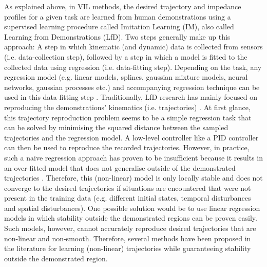 



As explained above, in VIL methods, the desired trajectory and impedance profiles for a given task are learned from human demonstrations using a supervised learning procedure called Imitation Learning (IM), also called Learning from Demonstrations (LfD). Two steps generally make up this approach: A step in which kinematic (and dynamic) data is collected from sensors (i.e. data-collection step), followed by a step in which a model is fitted to the collected data using regression (i.e. data-fitting step). Depending on the task, any regression model (e.g. linear models, splines, gaussian mixture models, neural networks, gaussian processes etc.) and accompanying regression technique can be used in this data-fitting step \cite{kroemerReviewRobotLearning2021,husseinImitationLearningSurvey2017}. Traditionally, LfD research has mainly focused on reproducing the demonstrations' kinematics (i.e. trajectories) \cite{siReviewManipulationSkill2021}. At first glance, this trajectory reproduction problem seems to be a simple regression task that can be solved by minimising the squared distance between the sampled trajectories and the regression model. A low-level controller like a PID controller can then be used to reproduce the recorded trajectories. However, in practice, such a naive regression approach has proven to be insufficient because it results in an over-fitted model that does not generalise outside of the demonstrated trajectories \cite{sindhwaniLearningContractingVector2018}. Therefore, this (non-linear) model is only locally stable and does not converge to the desired trajectories if situations are encountered that were not present in the training data (e.g. different initial states, temporal disturbances and spatial disturbances). One possible solution would be to use linear regression models in which stability outside the demonstrated regions can be proven easily. Such models, however, cannot accurately reproduce desired trajectories that are non-linear and non-smooth. Therefore, several methods have been proposed in the literature for learning (non-linear) trajectories while guaranteeing stability outside the demonstrated region.

